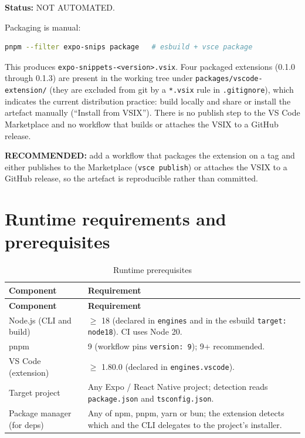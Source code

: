 \textbf{Status:} NOT AUTOMATED.

Packaging is manual:

\begin{lstlisting}[language=bash]
pnpm --filter expo-snips package   # esbuild + vsce package
\end{lstlisting}

This produces \texttt{expo-snippets-<version>.vsix}. Four packaged extensions
(0.1.0 through 0.1.3) are present in the working tree under
\texttt{packages/vscode-extension/} (they are excluded from git by a
\texttt{*.vsix} rule in \texttt{.gitignore}), which indicates the current
distribution practice: build locally and share or install the artefact manually
(``Install from VSIX''). There is no publish step to the VS Code Marketplace and
no workflow that builds or attaches the VSIX to a GitHub release.

\textbf{RECOMMENDED:} add a workflow that packages the extension on a tag and
either publishes to the Marketplace (\texttt{vsce publish}) or attaches the VSIX
to a GitHub release, so the artefact is reproducible rather than committed.

\section{Runtime requirements and prerequisites}

\begin{longtable}{@{}L{4cm}L{10.2cm}@{}}
\caption{Runtime prerequisites}\\
\toprule
\textbf{Component} & \textbf{Requirement} \\
\midrule
\endfirsthead
\toprule
\textbf{Component} & \textbf{Requirement} \\
\midrule
\endhead
Node.js (CLI and build) & $\geq$ 18 (declared in \texttt{engines} and in the
esbuild \texttt{target: node18}). CI uses Node 20. \\
pnpm & 9 (workflow pins \texttt{version: 9}); 9+ recommended. \\
VS Code (extension) & $\geq$ 1.80.0 (declared in \texttt{engines.vscode}). \\
Target project & Any Expo / React Native project; detection reads
\texttt{package.json} and \texttt{tsconfig.json}. \\
Package manager (for deps) & Any of npm, pnpm, yarn or bun; the extension detects
which and the CLI delegates to the project's installer. \\
\bottomrule
\end{longtable}


